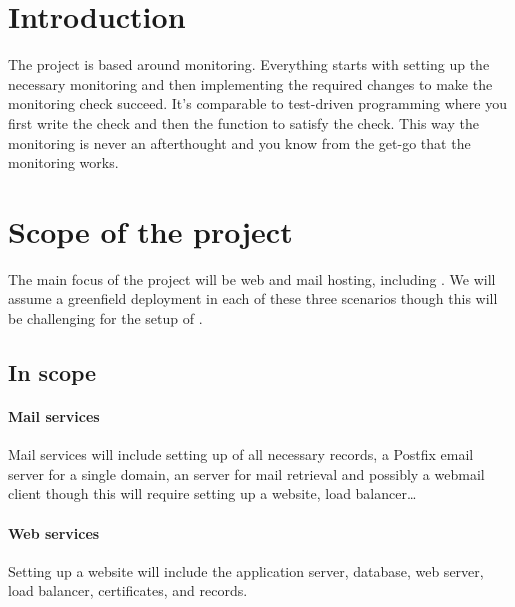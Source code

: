 \documentclass[a4paper,12pt,twoside]{scrartcl}
\begin{document}
\maketitle
\tableofcontents
\clearpage


\section{Introduction}
\label{sec:introduction}
The  project is based around monitoring.
Everything starts with setting up the necessary monitoring and then implementing the required changes to make the monitoring check succeed.
It's comparable to test-driven programming where you first write the check and then the function to satisfy the check.
This way the monitoring is never an afterthought and you know from the get-go that the monitoring works.


\section{Scope of the project}
\label{sec:scope}
The main focus of the project will be web and mail hosting, including .
We will assume a greenfield deployment in each of these three scenarios though this will be challenging for the setup of .

\subsection{In scope}

\paragraph{Mail services}
Mail services will include setting up of all necessary  records, a Postfix email server for a single domain, an  server for mail retrieval and possibly a webmail client though this will require setting up a website, load balancer\ldots

\paragraph{Web services}
Setting up a website will include the application server, database, web server, load balancer, certificates, and  records.
\end{document}
